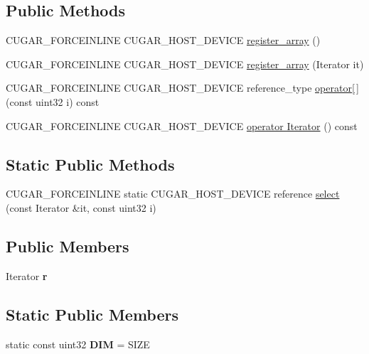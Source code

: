 \subsection*{Public Methods}
\begin{DoxyCompactItemize}
\item 
C\+U\+G\+A\+R\+\_\+\+F\+O\+R\+C\+E\+I\+N\+L\+I\+NE C\+U\+G\+A\+R\+\_\+\+H\+O\+S\+T\+\_\+\+D\+E\+V\+I\+CE \hyperlink{structcugar_1_1register__array_a44e755faa53196a2d7abdfbd19b388ef}{register\+\_\+array} ()
\item 
C\+U\+G\+A\+R\+\_\+\+F\+O\+R\+C\+E\+I\+N\+L\+I\+NE C\+U\+G\+A\+R\+\_\+\+H\+O\+S\+T\+\_\+\+D\+E\+V\+I\+CE \hyperlink{structcugar_1_1register__array_aa8482612bb61cc0e501d1e5da1c43ab0}{register\+\_\+array} (Iterator it)
\item 
C\+U\+G\+A\+R\+\_\+\+F\+O\+R\+C\+E\+I\+N\+L\+I\+NE C\+U\+G\+A\+R\+\_\+\+H\+O\+S\+T\+\_\+\+D\+E\+V\+I\+CE reference\+\_\+type \hyperlink{structcugar_1_1register__array_afb81e67899d46524ae21aee528c8c7e1}{operator\mbox{[}$\,$\mbox{]}} (const uint32 i) const
\item 
C\+U\+G\+A\+R\+\_\+\+F\+O\+R\+C\+E\+I\+N\+L\+I\+NE C\+U\+G\+A\+R\+\_\+\+H\+O\+S\+T\+\_\+\+D\+E\+V\+I\+CE \hyperlink{structcugar_1_1register__array_a93d2f8025d49d09013ee5b4179cb8a3f}{operator Iterator} () const
\end{DoxyCompactItemize}
\subsection*{Static Public Methods}
\begin{DoxyCompactItemize}
\item 
C\+U\+G\+A\+R\+\_\+\+F\+O\+R\+C\+E\+I\+N\+L\+I\+NE static C\+U\+G\+A\+R\+\_\+\+H\+O\+S\+T\+\_\+\+D\+E\+V\+I\+CE reference \hyperlink{structcugar_1_1register__array_a546daee4bb1bbc7d471367df7e74c900}{select} (const Iterator \&it, const uint32 i)
\end{DoxyCompactItemize}
\subsection*{Public Members}
\begin{DoxyCompactItemize}
\item 
\mbox{\label{structcugar_1_1register__array_a9327296fac7535bcbf649abd00f9121f}} 
Iterator {\bfseries r}
\end{DoxyCompactItemize}
\subsection*{Static Public Members}
\begin{DoxyCompactItemize}
\item 
\mbox{\label{structcugar_1_1register__array_a806a1021ecaa22a16cf1838323d6e202}} 
static const uint32 {\bfseries D\+IM} = S\+I\+ZE
\end{DoxyCompactItemize}


